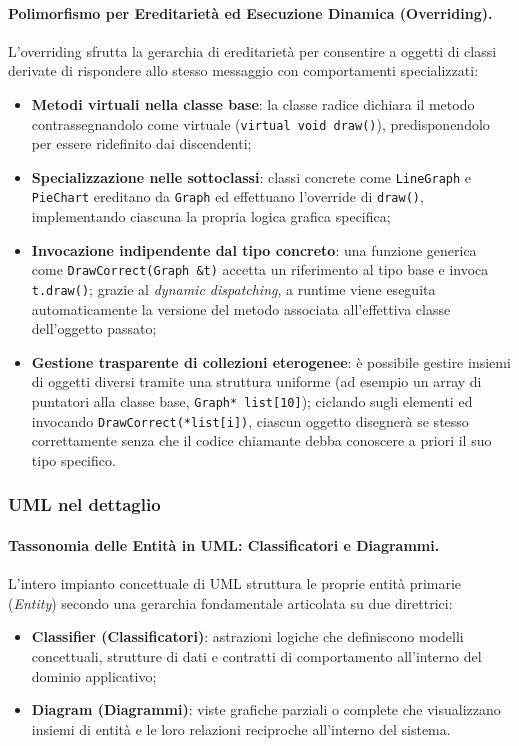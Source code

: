 \documentclass[12pt]{extarticle}
\begin{document}
\paragraph{Polimorfismo per Ereditarietà ed Esecuzione Dinamica (Overriding).}
L'overriding sfrutta la gerarchia di ereditarietà per consentire a oggetti di classi derivate di rispondere allo stesso messaggio con comportamenti specializzati:
\begin{itemize}
    \item \textbf{Metodi virtuali nella classe base}: la classe radice dichiara il metodo contrassegnandolo come virtuale (\texttt{virtual void draw()}), predisponendolo per essere ridefinito dai discendenti;
    \item \textbf{Specializzazione nelle sottoclassi}: classi concrete come \texttt{LineGraph} e \texttt{PieChart} ereditano da \texttt{Graph} ed effettuano l'override di \texttt{draw()}, implementando ciascuna la propria logica grafica specifica;
    \item \textbf{Invocazione indipendente dal tipo concreto}: una funzione generica come \texttt{DrawCorrect(Graph \&t)} accetta un riferimento al tipo base e invoca \texttt{t.draw()}; grazie al \textit{dynamic dispatching}, a runtime viene eseguita automaticamente la versione del metodo associata all'effettiva classe dell'oggetto passato;
    \item \textbf{Gestione trasparente di collezioni eterogenee}: è possibile gestire insiemi di oggetti diversi tramite una struttura uniforme (ad esempio un array di puntatori alla classe base, \texttt{Graph* list[10]}); ciclando sugli elementi ed invocando \texttt{DrawCorrect(*list[i])}, ciascun oggetto disegnerà se stesso correttamente senza che il codice chiamante debba conoscere a priori il suo tipo specifico.
\end{itemize}


\subsubsection{UML nel dettaglio}

\paragraph{Tassonomia delle Entità in UML: Classificatori e Diagrammi.}
L'intero impianto concettuale di UML struttura le proprie entità primarie (\textit{Entity}) secondo una gerarchia fondamentale articolata su due direttrici:
\begin{itemize}
    \item \textbf{Classifier (Classificatori)}: astrazioni logiche che definiscono modelli concettuali, strutture di dati e contratti di comportamento all'interno del dominio applicativo;
    \item \textbf{Diagram (Diagrammi)}: viste grafiche parziali o complete che visualizzano insiemi di entità e le loro relazioni reciproche all'interno del sistema.
\end{itemize}
\end{document}
